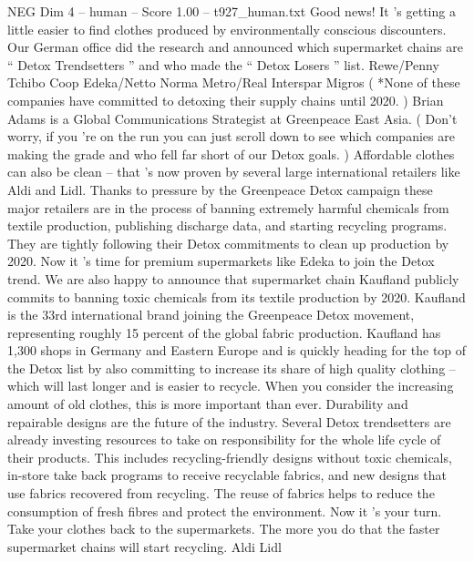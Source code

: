 \begin{textsample}{NEG Dim 4 – human – Score 1.00 – t927\_human.txt}  \label{ex:f4_neg_050}
Good news!
It ’s getting a little easier to find clothes produced by environmentally conscious discounters.
Our German office did the research and announced which supermarket chains are “ Detox Trendsetters ” and who made the “ Detox Losers ” list.
Rewe/Penny Tchibo Coop Edeka/Netto Norma Metro/Real Interspar Migros ( *None of these companies have committed to detoxing their supply chains until 2020. ) Brian Adams is a Global Communications Strategist at Greenpeace East Asia. ( Don't worry, if you ’re on the run you can just scroll down to see which companies are making the grade and who fell far short of our Detox goals. ) Affordable clothes can also be clean – that ’s now proven by several large international retailers like Aldi and Lidl.
Thanks to pressure by the Greenpeace Detox campaign these major retailers are in the process of banning extremely harmful chemicals from textile production, publishing discharge data, and starting recycling programs.
They are tightly following their Detox commitments to clean up production by 2020.
Now it ’s time for premium supermarkets like Edeka to join the Detox trend.
We are also happy to announce that supermarket chain Kaufland publicly commits to banning toxic chemicals from its textile production by 2020.
Kaufland is the 33rd international brand joining the Greenpeace Detox movement, representing roughly 15 percent of the global fabric production.
Kaufland has 1,300 shops in Germany and Eastern Europe and is quickly heading for the top of the Detox list by also committing to increase its share of high quality clothing – which will last longer and is easier to recycle.
When you consider the increasing amount of old clothes, this is more important than ever.
Durability and repairable designs are the future of the industry.
Several Detox trendsetters are already investing resources to take on responsibility for the whole life cycle of their products.
This includes recycling-friendly designs without toxic chemicals, in-store take back programs to receive recyclable fabrics, and new designs that use fabrics recovered from recycling.
The reuse of fabrics helps to reduce the consumption of fresh fibres and protect the environment.
Now it ’s your turn.
Take your clothes back to the supermarkets.
The more you do that the faster supermarket chains will start recycling.
Aldi Lidl

\end{textsample}
